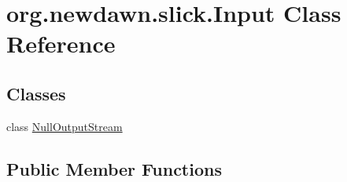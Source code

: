 \hypertarget{classorg_1_1newdawn_1_1slick_1_1_input}{}\section{org.\+newdawn.\+slick.\+Input Class Reference}
\label{classorg_1_1newdawn_1_1slick_1_1_input}
\subsection*{Classes}
\begin{DoxyCompactItemize}
\item 
class \mbox{\hyperlink{classorg_1_1newdawn_1_1slick_1_1_input_1_1_null_output_stream}{Null\+Output\+Stream}}
\end{DoxyCompactItemize}
\subsection*{Public Member Functions}
